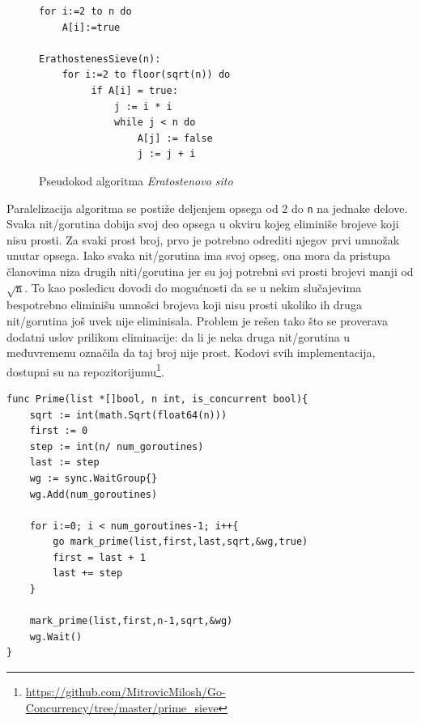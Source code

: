 \documentclass[12pt,oneside]{memoir}
\begin{document}
\begin{figure}
\begin{center}

\begin{Verbatim}[fontsize=\small]
for i:=2 to n do
    A[i]:=true

ErathostenesSieve(n):
    for i:=2 to floor(sqrt(n)) do 
         if A[i] = true:
             j := i * i
             while j < n do
                 A[j] := false 
                 j := j + i
\end{Verbatim}

\caption{Pseudokod algoritma \textit{Eratostenovo sito}}
\label{fig:prime_pseudo}
\end{center}
\end{figure}

Paralelizacija algoritma se postiže deljenjem opsega od 2 do \texttt{n} na jednake delove. Svaka nit/gorutina dobija svoj deo opsega u okviru kojeg eliminiše brojeve koji nisu prosti. Za svaki prost broj, prvo je potrebno odrediti njegov prvi umnožak unutar opsega. Iako svaka nit/gorutina ima svoj opseg, ona mora da pristupa članovima niza drugih niti/gorutina jer su joj potrebni svi prosti brojevi manji od $\sqrt{\texttt{n}}$. To kao posledicu dovodi do mogućnosti da se u nekim slučajevima bespotrebno eliminišu umnošci brojeva koji nisu prosti ukoliko ih druga nit/gorutina još uvek nije eliminisala. Problem je rešen tako što se proverava dodatni uslov prilikom eliminacije: da li je neka druga nit/gorutina u međuvremenu označila da taj broj nije prost. Kodovi svih implementacija, dostupni su na repozitorijumu\footnote{\url{https://github.com/MitrovicMilosh/Go-Concurrency/tree/master/prime_sieve}}.

\begin{center}
\begin{lstlisting}[caption=Implementacija konkurentne funkcije za određivanje prostih brojeva manjih od n u jeziku Go,label={lst:prime1},backgroundcolor=\color{background}]
func Prime(list *[]bool, n int, is_concurrent bool){
	sqrt := int(math.Sqrt(float64(n)))
	first := 0
	step := int(n/ num_goroutines)
	last := step
	wg := sync.WaitGroup{}
	wg.Add(num_goroutines)

	for i:=0; i < num_goroutines-1; i++{
		go mark_prime(list,first,last,sqrt,&wg,true)
		first = last + 1
		last += step
	}

	mark_prime(list,first,n-1,sqrt,&wg)
	wg.Wait()
}
\end{lstlisting}
\end{center}
\end{document}
